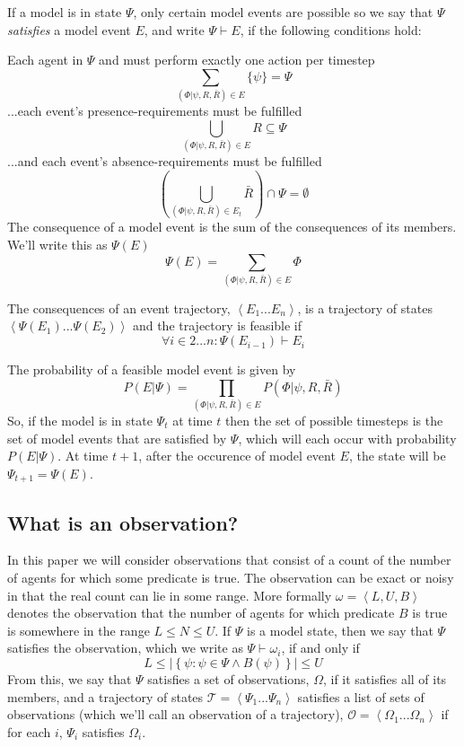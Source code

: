 \documentclass{article}
\begin{document}
If a model is in state $\Psi$, only certain model events are possible so we say that $\Psi$ \textit{satisfies} a model event $E$, and write $\Psi\vdash E$, if the following conditions hold:

Each agent in $\Psi$ and must perform exactly one action per timestep
\begin{equation}
\sum_{(\Phi|\psi,R,\bar{R})\in E}\{\psi\} = \Psi
\label{agency}
\end{equation}
...each event's presence-requirements must be fulfilled
\[
\bigcup_{(\Phi|\psi,R,\bar{R})\in E} R \subseteq \Psi
\]
...and each event's absence-requirements must be fulfilled
\[
\left(\bigcup_{(\Phi|\psi,R,\bar{R})\in E_t} \bar{R}\right) \cap \Psi = \emptyset
\]
The consequence of a model event is the sum of the consequences of its members. We'll write this as $\Psi(E)$
\begin{equation}
\Psi(E) = \sum_{(\Phi|\psi,R,\bar{R})\in E}\Phi
\label{psie}
\end{equation}

The consequences of an event trajectory, $\left<E_1...E_n\right>$, is a trajectory of states $\left<\Psi(E_1)...\Psi(E_2)\right>$ and the trajectory is feasible if
\[
\forall i\in 2...n: \Psi(E_{i-1}) \vdash E_i
\]

The probability of a feasible model event is given by
\[
P(E|\Psi) = \prod_{(\Phi|\psi,R,\bar{R}) \in E} P(\Phi|\psi,R,\bar{R})
\]
So, if the model is in state $\Psi_t$ at time $t$ then the set of possible timesteps is the set of model events that are satisfied by $\Psi$, which will each occur with probability $P(E|\Psi)$. At time $t+1$, after the occurence of model event $E$, the state will be $\Psi_{t+1} = \Psi(E)$.


\subsection{What is an observation?}

In this paper we will consider observations that consist of a count of the number of agents for which some predicate is true. The observation can be exact or noisy in that the real count can lie in some range. More formally $\omega = \left<L,U,B\right>$ denotes the observation that the number of agents for which predicate $B$ is true is somewhere in the range  $L \le N \le U$. If $\Psi$ is a model state,  then we say that $\Psi$ satisfies the observation, which we write as $\Psi \vdash \omega_i$, if and only if
\[
L \le \left|\left\{\psi:\psi \in \Psi \wedge B(\psi)\right\}\right| \le U
\]
From this, we say that $\Psi$ satisfies a set of observations, $\Omega$, if it satisfies all of its members, and a trajectory of states $\mathcal{T} = \left<\Psi_1...\Psi_n\right>$ satisfies a list of sets of observations (which we'll call an observation of a trajectory), $\mathcal{O} = \left<\Omega_1...\Omega_n\right>$ if for each $i$, $\Psi_i$ satisfies $\Omega_i$.
\end{document}
